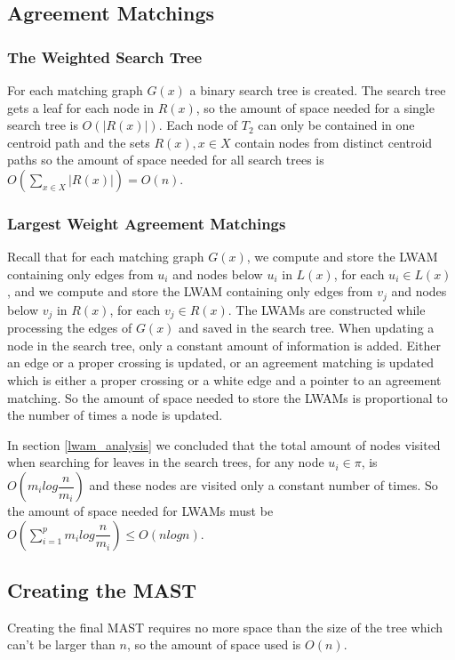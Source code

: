 \subsection{Agreement Matchings}
\subsubsection{The Weighted Search Tree}
For each matching graph $G(x)$ a binary search tree is created. The search tree gets a leaf for each node in $R(x)$, so the amount of space needed for a single search tree is $O(|R(x)|)$. Each node of $T_2$ can only be contained in one centroid path and the sets $R(x), x \in X$ contain nodes from distinct centroid paths so the amount of space needed for all search trees is $O(\sum_{x \in X} |R(x)|) = O(n)$.

\subsubsection{Largest Weight Agreement Matchings}
Recall that for each matching graph $G(x)$, we compute and store the LWAM containing only edges from $u_i$ and nodes below $u_i$ in $L(x)$, for each $u_i \in L(x)$, and we compute and store the LWAM containing only edges from $v_j$ and nodes below $v_j$ in $R(x)$, for each $v_j \in R(x)$. The LWAMs are constructed while processing the edges of $G(x)$ and saved in the search tree. When updating a node in the search tree, only a constant amount of information is added. Either an edge or a proper crossing is updated, or an agreement matching is updated which is either a proper crossing or a white edge and a pointer to an agreement matching. So the amount of space needed to store the LWAMs is proportional to the number of times a node is updated.

In section \ref{lwam_analysis} we concluded that the total amount of nodes visited when searching for leaves in the search trees, for any node $u_i \in \pi$, is $O(m_ilog\dfrac{n}{m_i})$ and these nodes are visited only a constant number of times. So the amount of space needed for LWAMs must be  $O(\sum_{i=1}^p m_ilog\dfrac{n}{m_i}) \le O(nlogn)$.

\subsection{Creating the MAST}
Creating the final MAST requires no more space than the size of the tree which can't be larger than $n$, so the amount of space used is $O(n)$.

